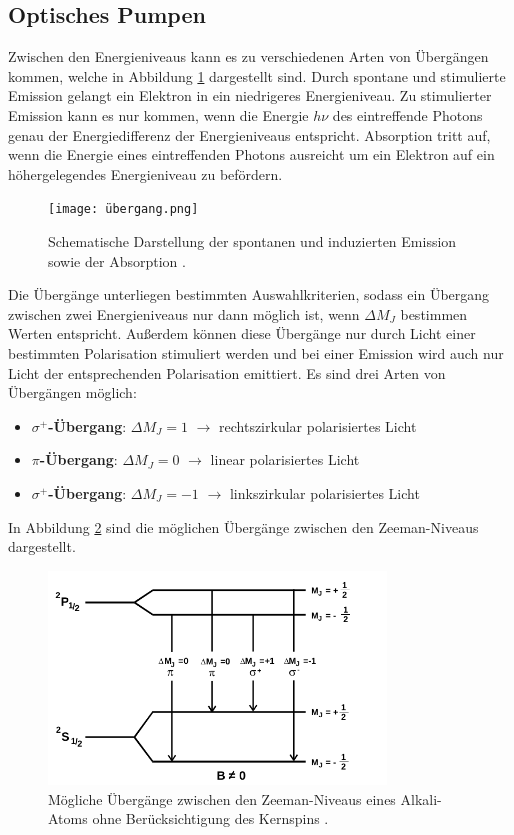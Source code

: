 \subsection{Optisches Pumpen}
Zwischen den Energieniveaus kann es zu verschiedenen Arten von Übergängen kommen, welche in Abbildung \ref{fig:tfig2} dargestellt sind.
Durch spontane und stimulierte Emission gelangt ein Elektron in ein niedrigeres Energieniveau.
Zu stimulierter Emission kann es nur kommen, wenn die Energie $h \nu$ des eintreffende Photons genau der Energiedifferenz der Energieniveaus entspricht.
Absorption tritt auf, wenn die Energie eines eintreffenden Photons ausreicht um ein Elektron auf ein höhergelegendes Energieniveau zu befördern.
\FloatBarrier
\begin{figure}[h]
    \centering
    \texttt{[image: übergang.png]}
    \caption{Schematische Darstellung der spontanen und induzierten Emission sowie der Absorption \cite{quelle02}.}
    \label{fig:tfig2}
\end{figure}
\FloatBarrier
\noindent

Die Übergänge unterliegen bestimmten Auswahlkriterien, sodass ein Übergang zwischen zwei Energieniveaus nur dann möglich ist, wenn $\Delta M_J$ bestimmen Werten entspricht.
Außerdem können diese Übergänge nur durch Licht einer bestimmten Polarisation stimuliert werden und bei einer Emission wird auch nur Licht der entsprechenden Polarisation emittiert.
Es sind drei Arten von Übergängen möglich:
\begin{itemize}
\item \textbf{$\sigma^+$-Übergang}: $\Delta M_J=1$ $\rightarrow$ rechtszirkular polarisiertes Licht
\item \textbf{$\pi$-Übergang}: $\Delta M_J=0$ $\rightarrow$ linear polarisiertes Licht
\item \textbf{$\sigma^+$-Übergang}: $\Delta M_J=-1$ $\rightarrow$ linkszirkular polarisiertes Licht
\end{itemize}
In Abbildung \ref{fig:tfig3} sind die möglichen Übergänge zwischen den Zeeman-Niveaus dargestellt.
\FloatBarrier
\begin{figure}[h]
    \centering
    \includegraphics[width=0.8\textwidth]{pumpenschema.png}
    \caption{Mögliche Übergänge zwischen den Zeeman-Niveaus eines Alkali-Atoms ohne Berücksichtigung des Kernspins \cite{quelle01}.}
    \label{fig:tfig3}
\end{figure}
\FloatBarrier
\noindent


